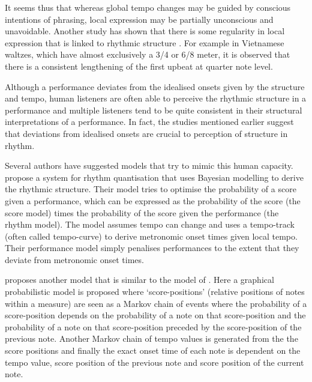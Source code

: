 It seems thus that whereas global tempo changes may be guided by conscious intentions of phrasing, local expression may be partially unconscious and unavoidable. Another study has shown that there is some regularity in local expression that is linked to rhythmic structure \citep{bengtsson1983analysis}. For example in Vietnamese waltzes, which have almost exclusively a 3/4 or 6/8 meter, it is observed that there is a consistent lengthening of the first upbeat at quarter note level.

Although a performance deviates from the idealised onsets given by the structure and tempo, human listeners are often able to perceive the rhythmic structure in a performance and multiple listeners tend to be quite consistent in their structural interpretations of a performance. In fact, the studies mentioned earlier suggest that deviations from idealised onsets are crucial to perception of structure in rhythm.


Several authors have suggested models that try to mimic this human capacity. \citet{cemgil2000rhythm} propose a system for rhythm quantisation that uses Bayesian modelling to derive the rhythmic structure. Their model tries to optimise the probability of a score given a performance, which can be expressed as the probability of the score (the score model) times the probability of the score given the performance (the rhythm model). The model assumes tempo can change and uses a tempo-track (often called tempo-curve) to derive metronomic onset times given local tempo. Their performance model simply penalises performances to the extent that they deviate from metronomic onset times. 

\citet{raphael2002hybrid} proposes another model that is similar to the model of \citet{cemgil2000rhythm}. Here a graphical probabilistic model is proposed where `score-positions' (relative positions of notes within a measure) are seen as a Markov chain of events where the probability of a score-position depends on the probability of a note on that score-position and the probability of a note on that score-position preceded by the score-position of the previous note. Another Markov chain of tempo values is generated from the the score positions and finally the exact onset time of each note is dependent on the tempo value, score position of the previous note and score position of the current note.

